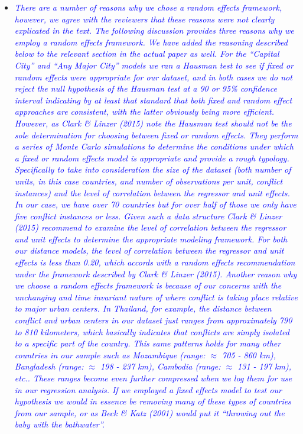 \begin{enumerate}
\begin{itemize}
\item \textcolor{blue}{\emph{
	There are a number of reasons why we chose a random effects framework, however, we agree with the reviewers that these reasons were not clearly explicated in the text. The following discussion provides three reasons why we employ a random effects framework. We have added the reasoning described below to the relevant section in the actual paper as well.
	For the ``Capital City'' and ``Any Major City'' models we ran a Hausman test to see if fixed or random effects were appropriate for our dataset, and in both cases we do not reject the null hypothesis of the Hausman test at a 90 or 95\% confidence interval indicating by at least that standard that both fixed and random effect approaches are consistent, with the latter obviously being more efficient.
	However, as Clark \& Linzer (2015) note the Hausman test should not be the sole determination for choosing between fixed or random effects. They perform a series of Monte Carlo simulations to determine the conditions under which a fixed or random effects model is appropriate and provide a rough typology. Specifically to take into consideration the size of the dataset (both number of units, in this case countries, and number of observations per unit, conflict instances) and the level of correlation between the regressor and unit effects. In our case, we have over 70 countries but for over half of those we only have five conflict instances or less. Given such a data structure Clark \& Linzer (2015) recommend to examine the level of correlation between the regressor and unit effects to determine the appropriate modeling framework. For both our distance models, the level of correlation between the regressor and unit effects is less than 0.20, which accords with a random effects recommendation under the framework described by Clark \& Linzer (2015). 
	Another reason why we choose a random effects framework is because of our concerns with the unchanging and time invariant nature of where conflict is taking place relative to major urban centers. In Thailand, for example, the distance between conflict and urban centers in our dataset just ranges from approximately 790 to 810 kilometers, which basically indicates that conflicts are simply isolated to a specific part of the country. This same patterns holds for many other countries in our sample such as Mozambique (range: $\approx$ 705 - 860 km), Bangladesh (range: $\approx$ 198 - 237 km), Cambodia (range: $\approx$ 131 - 197 km), etc.. These ranges become even further compressed when we log them for use in our regression analysis. If we employed a fixed effects model to test our hypothesis we would in essence be removing many of these types of countries from our sample, or as Beck \& Katz (2001) would put it ``throwing out the baby with the bathwater''. 
}}
\end{itemize}


\end{enumerate}
